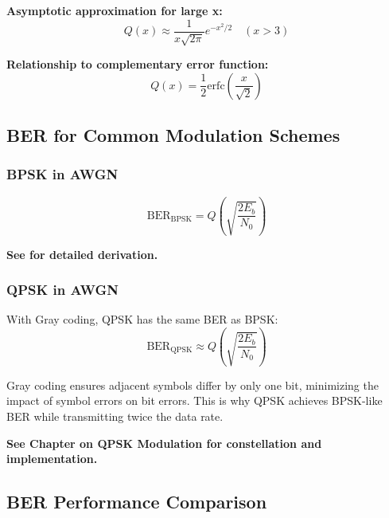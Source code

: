 \textbf{Asymptotic approximation for large x:}
\begin{equation}
\label{eq:q-approximation}
Q(x) \approx \frac{1}{x\sqrt{2\pi}} e^{-x^2/2} \quad (x > 3)
\end{equation}

\textbf{Relationship to complementary error function:}
\begin{equation}
\label{eq:q-erfc}
Q(x) = \frac{1}{2}\mathrm{erfc}\left(\frac{x}{\sqrt{2}}\right)
\end{equation}

\subsection{BER for Common Modulation Schemes}
\label{subsec:ber-formulas}

\subsubsection{BPSK in AWGN}

\begin{equation}
\label{eq:ber-bpsk}
\text{BER}_{\text{BPSK}} = Q\left(\sqrt{\frac{2E_b}{N_0}}\right)
\end{equation}

\textbf{See  for detailed derivation.}

\subsubsection{QPSK in AWGN}

With Gray coding, QPSK has the same BER as BPSK:
\begin{equation}
\label{eq:ber-qpsk}
\text{BER}_{\text{QPSK}} \approx Q\left(\sqrt{\frac{2E_b}{N_0}}\right)
\end{equation}

\begin{importantbox}
Gray coding ensures adjacent symbols differ by only one bit, minimizing the impact of symbol errors on bit errors. This is why QPSK achieves BPSK-like BER while transmitting twice the data rate.
\end{importantbox}

\textbf{See Chapter on QPSK Modulation for constellation and implementation.}

\subsection{BER Performance Comparison}
\label{subsec:ber-comparison}

